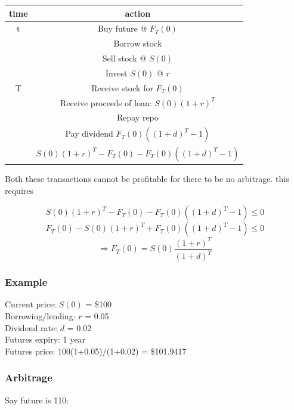 \begin{tiny}
\begin{center} \begin{tabular}{|c|c|}
  \hline
  time & action \\
  \hline
  t & Buy future @ $F_T(0)$  \\
    & Borrow stock \\
    & Sell stock @ $S(0)$  \\
    & Invest $S(0)$ @ $r$\\
  \hline
  T & Receive stock for $F_T(0)$ \\
    & Receive proceeds of loan: $S(0)(1+r)^{T}$\\
    & Repay repo \\
    & Pay dividend $F_T(0)((1+d)^{T}-1)$\\
  \hline
   & $S(0)(1+r)^{T}-F_T(0) - F_T(0)((1+d)^{T}-1)$\\
  \hline
\end{tabular}\end{center}
\end{tiny}

Both these transactions cannot be profitable for there to be no arbitrage. this requires

\[S(0)(1+r)^{T}-F_T(0) - F_T(0)((1+d)^{T}-1) \leq 0 \]
\[F_T(0) - S(0)(1+r)^{T} + F_T(0)((1+d)^{T}-1) \leq 0 \]
\[ \Rightarrow F_T(0) = S(0)\frac{(1+r)^{T}}{(1+d)^{T}}  \]

\subsubsection{Example}
Current price: $S(0)$ = \$100\\
Borrowing/lending: $r$ = 0.05\\
Dividend rate: $d$ = 0.02\\
Futures expiry: 1 year\\
Futures price: 100(1+0.05)/(1+0.02) = \$101.9417 

\subsubsection{Arbitrage}


Say future is 110:


